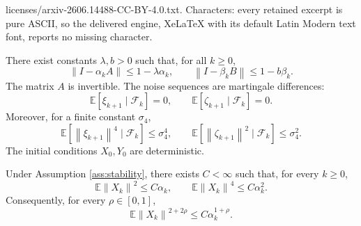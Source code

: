 \documentclass[10pt,a4paper]{amsart}
\newcommand{\E}{\mathbb{E}}
\newcommand{\norm}[1]{\left\lVert #1\right\rVert}
\begin{document}
licenses/arxiv-2606.14488-CC-BY-4.0.txt. Characters: every retained excerpt is pure ASCII, so the delivered engine, XeLaTeX with its default Latin Modern text font, reports no missing character.
\begin{assumption}\label{ass:stability}
There exist constants $\lambda,b>0$ such that, for all $k\ge0$,
\begin{equation}
  \norm{I-\alpha_k A}\le 1-\lambda\alpha_k,
  \qquad
  \norm{I-\beta_k B}\le 1-b\beta_k. \label{eq:matrix-contraction}
\end{equation}
The matrix $A$ is invertible. The noise sequences are martingale differences:
\begin{equation}
  \E[\xi_{k+1}\mid\mathcal F_k]=0,
  \qquad
  \E[\zeta_{k+1}\mid\mathcal F_k]=0. \label{eq:mds}
\end{equation}
Moreover, for a finite constant $\sigma_4$,
\begin{equation}
  \E[\norm{\xi_{k+1}}^4\mid\mathcal F_k]\le \sigma_4^4,
  \qquad
  \E[\norm{\zeta_{k+1}}^2\mid\mathcal F_k]\le \sigma_4^2. \label{eq:moment-noise}
\end{equation}
The initial conditions $X_0,Y_0$ are deterministic.
\end{assumption}

\begin{lemma}\label{lem:fast-moments}
Under Assumption \ref{ass:stability}, there exists $C<\infty$ such that, for every $k\ge0$,
\begin{equation}
  \E\norm{X_k}^2\le C\alpha_k,\qquad
  \E\norm{X_k}^4\le C\alpha_k^2. \label{eq:fast-second-fourth}
\end{equation}
Consequently, for every $\rho\in[0,1]$,
\begin{equation}
  \E\norm{X_k}^{2+2\rho}\le C\alpha_k^{1+\rho}. \label{eq:fast-interp}
\end{equation}
\end{lemma}
\end{document}
